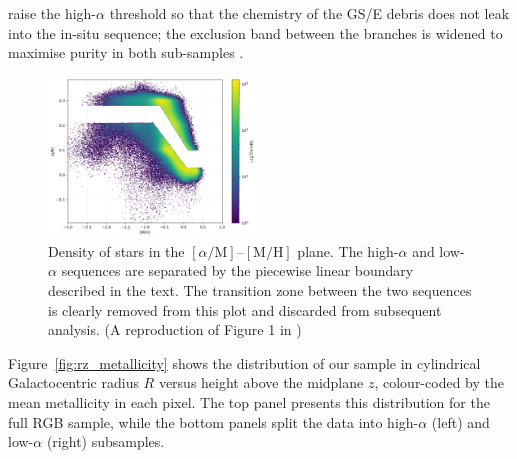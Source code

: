 \documentclass[a4paper,12pt]{article}
\begin{document}
\citet{Vis2024} raise the high-$\alpha$ threshold so that the
chemistry of the GS/E debris
\citep{Belokurov2018,Helmi2018} does not leak into the
in-situ sequence; the exclusion band between the branches is widened to maximise purity
in both sub-samples \citep{Vis2024}.

\begin{figure}[H]
    \centering
    \includegraphics[width=0.49\textwidth]{../figures/alpha_vs_metalicity.png}
    \caption{Density of stars in the $[\alpha/\mathrm{M}]$–$[\mathrm{M/H}]$ plane.
             The high-$\alpha$ and low-$\alpha$ sequences are separated by the
             piecewise linear boundary described in the text. The transition zone
             between the two sequences is clearly removed from this plot and discarded from
             subsequent analysis. (A reproduction of Figure 1 in \citet{Vis2024})}
    \label{fig:alphametal}
\end{figure}


Figure~\ref{fig:rz_metallicity} shows the distribution of our sample in cylindrical Galactocentric radius 
$R$ versus height above the midplane $z$, colour-coded by the mean metallicity in each pixel. The top panel 
presents this distribution for the full RGB sample, while the bottom panels split the data into high-$\alpha$ 
(left) and low-$\alpha$ (right) subsamples. 
\end{document}
